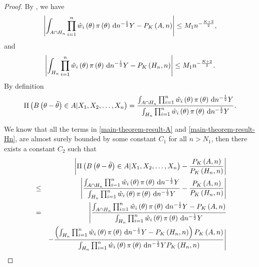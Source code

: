 \begin{thm}
\begin{proof}
By , we have 
\begin{equation}
\left|\int_{A\cap H_{n}}\prod_{i=1}^{n}\hat{w}_{i}\left(\theta\right)\pi\left(\theta\right)\,\mathrm{d} n^{-\frac{1}{2}}Y-P_{K}\left(A,n\right)\right|\le M_{1}n^{-\frac{K+2}{2}},\label{eq:main-theorem-result-A}
\end{equation}
and 
\begin{equation}
\left|\int_{H_{n}}\prod_{i=1}^{n}\hat{w}_{i}\left(\theta\right)\pi\left(\theta\right)\,\mathrm{d} n^{-\frac{1}{2}}Y-P_{K}\left(H_{n},n\right)\right|\le M_{1}n^{-\frac{K+2}{2}}.\label{eq:main-theorem-result-Hn}
\end{equation}
By definition 
\[
\Pi\left(B\left(\theta-\tilde{\theta}\right)\in A|X_{1},X_{2},\ldots,X_{n}\right)=\frac{\int_{A\cap H_{n}}\prod_{i=1}^{n}\hat{w}_{i}\left(\theta\right)\pi\left(\theta\right)\,\mathrm{d} n^{-\frac{1}{2}}Y}{\int_{H_{n}}\prod_{i=1}^{n}\hat{w}_{i}\left(\theta\right)\pi\left(\theta\right)\,\mathrm{d} n^{-\frac{1}{2}}Y}.
\]
\begin{comment}
add more detail in bounded. bounded above and below.
\end{comment}
We know that all the terms in \ref{main-theorem-result-A} and \ref{main-theorem-result-Hn},
are almost surely bounded by some constant $C_{1}$ for all $n>N_{1}$,
then there exists a constant $C_2$ such that
\begin{eqnarray}
 &  & \left|\Pi\left(B\left(\theta-\tilde{\theta}\right)\in A|X_{1},X_{2},\ldots,X_{n}\right)-\frac{P_{K}\left(A,n\right)}{P_{K}\left(H_{n},n\right)}\right|\nonumber \\
 & \le & \left|\frac{\int_{A\cap H_{n}}\prod_{i=1}^{n}\hat{w}_{i}\left(\theta\right)\pi\left(\theta\right)\diff n^{-\frac{1}{2}}Y}{\int_{H_{n}}\prod_{i=1}^{n}\hat{w}_{i}\left(\theta\right)\pi\left(\theta\right)\diff n^{-\frac{1}{2}}Y}-\frac{P_{K}\left(A,n\right)}{P_{K}\left(H_{n},n\right)}\right|\nonumber \\
 & = & \Bigg|\frac{\int_{A\cap H_{n}}\prod_{i=1}^{n}\hat{w}_{i}\left(\theta\right)\pi\left(\theta\right)\diff n^{-\frac{1}{2}}Y-P_{K}\left(A,n\right)}{\int_{H_{n}}\prod_{i=1}^{n}\hat{w}_{i}\left(\theta\right)\pi\left(\theta\right)\diff n^{-\frac{1}{2}}Y}\nonumber \\
 &  & -\frac{\left(\int_{H_{n}}\prod_{i=1}^{n}\hat{w}_{i}\left(\theta\right)\pi\left(\theta\right)\diff n^{-\frac{1}{2}}Y-P_{K}\left(H_{n},n\right)\right)P_{K}\left(A,n\right)}{\int_{H_{n}}\prod_{i=1}^{n}\hat{w}_{i}\left(\theta\right)\pi\left(\theta\right)\diff n^{-\frac{1}{2}}YP_{K}\left(H_{n},n\right)}\Bigg|\nonumber \\

\end{eqnarray}
\end{proof}
\end{thm}

